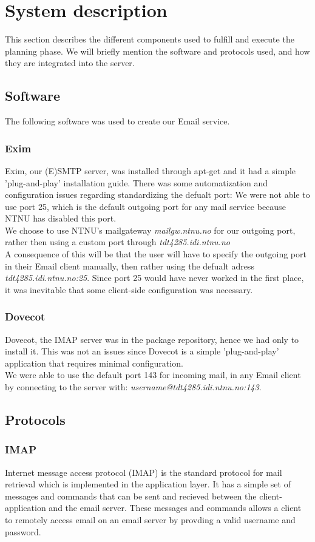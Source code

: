 \section{System description}
This section describes the different components used to fulfill and
execute the planning phase. We will briefly mention the software and
protocols used, and how they are integrated into the server.
\subsection{Software}
The following software was used to create our Email service.
\subsubsection{Exim}
Exim, our (E)SMTP server, was installed through apt-get and it had a simple
'plug-and-play' installation guide. There was some automatization and
configuration issues regarding standardizing the defualt port: We were
not able to use port 25, which is the default outgoing port for any mail
service because NTNU has disabled this port. \\
We choose to use NTNU's mailgateway \emph{mailgw.ntnu.no} for our
outgoing port, rather then using a custom port through
\emph{tdt4285.idi.ntnu.no}\\ A consequence of this will be that the user
will have to specify the outgoing port in their Email client manually,
then rather using the defualt adress \emph{tdt4285.idi.ntnu.no:25}.
Since port 25 would have never worked in the first place, it was
inevitable that some client-side configuration was necessary.
\subsubsection{Dovecot}
Dovecot, the IMAP server was in the package repository, hence we had
only to install it. This was not an issues since Dovecot is a simple
'plug-and-play' application that requires minimal configuration. \\
We were able to use the default port 143 for incoming mail, in any Email
client by connecting to the server with:
\emph{username@tdt4285.idi.ntnu.no:143}.
\subsection{Protocols}
\subsubsection{IMAP}
Internet message access protocol (IMAP) is the standard protocol for
mail retrieval which is implemented in the application layer. It has a
simple set of messages and commands that can be sent and recieved
between the client-application and the email server. These messages and
commands allows a client to remotely access email on an email server by
provding a valid username and password.
